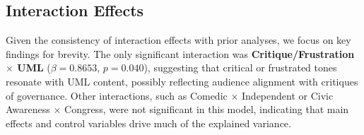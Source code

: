 \documentclass[12pt,a4paper]{report}
\begin{document}

\subsection{Interaction Effects}
Given the consistency of interaction effects with prior analyses, we focus on key findings for brevity. The only significant interaction was \textbf{Critique/Frustration $\times$ UML} ($\beta = 0.8653$, $p = 0.040$), suggesting that critical or frustrated tones resonate with UML content, possibly reflecting audience alignment with critiques of governance. Other interactions, such as Comedic $\times$ Independent or Civic Awareness $\times$ Congress, were not significant in this model, indicating that main effects and control variables drive much of the explained variance.
\newpage
\end{document}
